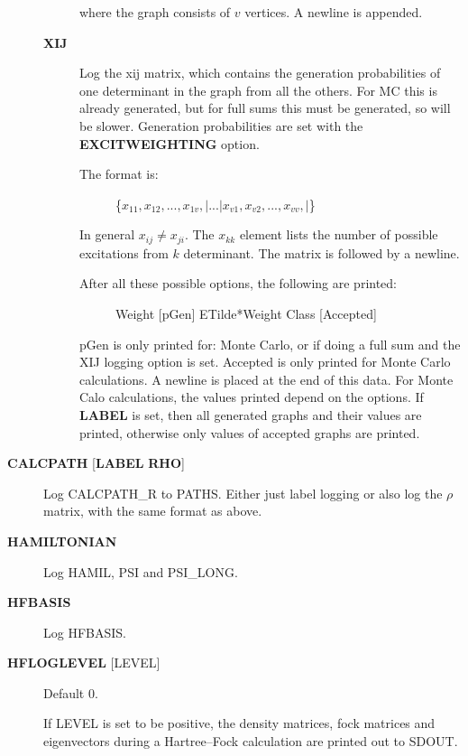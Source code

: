 \documentclass[openany,a4paper,10pt]{manual}
\begin{document}
\begin{description}
\begin{description}
\begin{description}
\end{description}

where the graph consists of $v$  vertices.  A newline is appended.

\item[\textbf{XIJ}]
Log the xij matrix, which contains the generation probabilities
of one determinant in the graph from all the others.  For MC this
is already generated, but for full sums this must be generated,
so will be slower.  Generation probabilities are set with the
\textbf{EXCITWEIGHTING} option.
\begin{description}
\item[The format is:]
\{$x_{11}, x_{12}, ..., x_{1v},| ... | x_{v1}, x_{v2}, ..., x_{vv},|$\}

\end{description}

In general $x_{ij} \ne x_{ji}$.  The $x_{kk}$ element lists
the number of possible excitations from $k$ determinant.
The matrix is followed by a newline.
\begin{description}
\item[After all these possible options, the following are printed:]
Weight {[}pGen{]} ETilde*Weight Class {[}Accepted{]}

\end{description}

pGen is only printed for: Monte Carlo, or if doing a full sum
and the XIJ logging option is set.  Accepted is only printed
for Monte Carlo calculations.  A newline is placed at the end
of this data.  For Monte Calo calculations, the values printed
depend on the options.  If \textbf{LABEL} is set, then all generated
graphs and their values are printed, otherwise only values of
accepted graphs are printed.

\end{description}

\item[\textbf{CALCPATH} {[}\textbf{LABEL} \textbf{RHO}{]}]
Log CALCPATH\_R to PATHS.  Either just label logging or also
log the $\rho$ matrix, with the same format as above.

\item[\textbf{HAMILTONIAN}]
Log HAMIL, PSI and PSI\_LONG.

\item[\textbf{HFBASIS}]
Log HFBASIS.

\item[\textbf{HFLOGLEVEL} {[}LEVEL{]}]
Default 0.

If LEVEL is set to be positive, the density matrices, fock matrices and
eigenvectors during a Hartree--Fock calculation are printed out to SDOUT.


\end{description}
\end{document}
